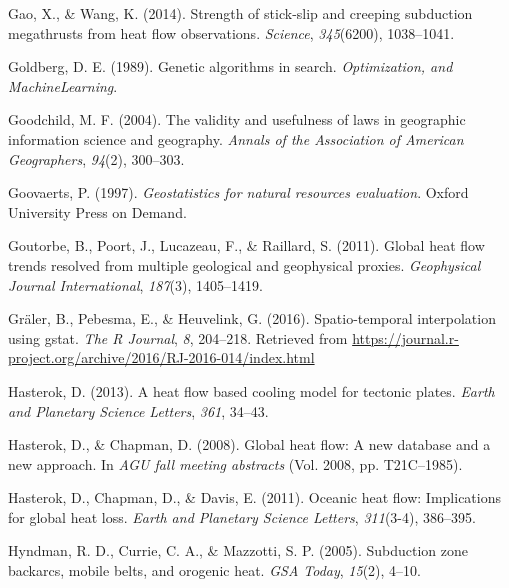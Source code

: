 \documentclass[draft,linenumbers]{agujournal2018}
\newlength{\cslhangindent}
\newenvironment{CSLReferences}[3] %
 {%
  \setlength{\parindent}{0pt}
  \ifodd #1 \everypar{\setlength{\hangindent}{\cslhangindent}}\ignorespaces\fi
  \ifnum #2 > 0
  \setlength{\parskip}{#2\baselineskip}
  \fi
 }%
 {}
\begin{document}
\begin{CSLReferences}{1}{0}
\leavevmode{}%
Gao, X., \& Wang, K. (2014). Strength of stick-slip and creeping
subduction megathrusts from heat flow observations. \emph{Science},
\emph{345}(6200), 1038--1041.

\leavevmode{}%
Goldberg, D. E. (1989). Genetic algorithms in search.
\emph{Optimization, and MachineLearning}.

\leavevmode{}%
Goodchild, M. F. (2004). The validity and usefulness of laws in
geographic information science and geography. \emph{Annals of the
Association of American Geographers}, \emph{94}(2), 300--303.

\leavevmode{}%
Goovaerts, P. (1997). \emph{Geostatistics for natural resources
evaluation}. Oxford University Press on Demand.

\leavevmode{}%
Goutorbe, B., Poort, J., Lucazeau, F., \& Raillard, S. (2011). Global
heat flow trends resolved from multiple geological and geophysical
proxies. \emph{Geophysical Journal International}, \emph{187}(3),
1405--1419.

\leavevmode{}%
Gräler, B., Pebesma, E., \& Heuvelink, G. (2016). Spatio-temporal
interpolation using gstat. \emph{The R Journal}, \emph{8}, 204--218.
Retrieved from
\url{https://journal.r-project.org/archive/2016/RJ-2016-014/index.html}

\leavevmode{}%
Hasterok, D. (2013). A heat flow based cooling model for tectonic
plates. \emph{Earth and Planetary Science Letters}, \emph{361}, 34--43.

\leavevmode{}%
Hasterok, D., \& Chapman, D. (2008). Global heat flow: A new database
and a new approach. In \emph{AGU fall meeting abstracts} (Vol. 2008, pp.
T21C--1985).

\leavevmode{}%
Hasterok, D., Chapman, D., \& Davis, E. (2011). Oceanic heat flow:
Implications for global heat loss. \emph{Earth and Planetary Science
Letters}, \emph{311}(3-4), 386--395.

\leavevmode{}%
Hyndman, R. D., Currie, C. A., \& Mazzotti, S. P. (2005). Subduction
zone backarcs, mobile belts, and orogenic heat. \emph{GSA Today},
\emph{15}(2), 4--10.


\end{CSLReferences}
\end{document}
